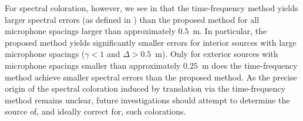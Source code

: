 
For spectral coloration, however, we see in  that the time-frequency method yields larger spectral errors (as defined in ) than the proposed method for all microphone spacings larger than approximately $0.5$~m.
In particular, the proposed method yields significantly smaller errors for interior sources with large microphone spacings ($\gamma < 1$ and $\Delta > 0.5$~m).
Only for exterior sources with microphone spacings smaller than approximately $0.25$~m does the time-frequency method achieve smaller spectral errors than the proposed method.
As the precise origin of the spectral coloration induced by translation via the time-frequency method remains unclear, future investigations should attempt to determine the source of, and ideally correct for, such colorations.

